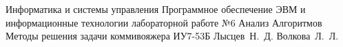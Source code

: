 \documentclass{bmstu}
\begin{document}
\makereporttitle
{Информатика и системы управления} %
{Программное обеспечение ЭВМ и информационные технологии}
{лабораторной работе №6} %
{Анализ Алгоритмов} %
{Методы решения задачи коммивояжера} %
{} %
{ИУ7-53Б} %
{Лысцев~Н.~Д.} %
{Волкова~Л.~Л.}

\maketableofcontents






%

\makebibliography
\end{document}
